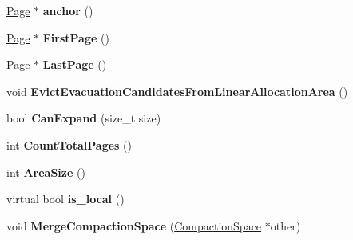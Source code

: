 \begin{DoxyCompactItemize}
\item 
\hyperlink{classv8_1_1internal_1_1_page}{Page} $\ast$ {\bfseries anchor} ()\hypertarget{classv8_1_1internal_1_1_paged_space_a66a4527d2121356cad29935ecfdcb6c9}{}\label{classv8_1_1internal_1_1_paged_space_a66a4527d2121356cad29935ecfdcb6c9}

\item 
\hyperlink{classv8_1_1internal_1_1_page}{Page} $\ast$ {\bfseries First\+Page} ()\hypertarget{classv8_1_1internal_1_1_paged_space_a4bb04dc4c0be6f0d8d98f47a3ea96ccf}{}\label{classv8_1_1internal_1_1_paged_space_a4bb04dc4c0be6f0d8d98f47a3ea96ccf}

\item 
\hyperlink{classv8_1_1internal_1_1_page}{Page} $\ast$ {\bfseries Last\+Page} ()\hypertarget{classv8_1_1internal_1_1_paged_space_a1c5d5e6fbf1a256f7e639a29344d3454}{}\label{classv8_1_1internal_1_1_paged_space_a1c5d5e6fbf1a256f7e639a29344d3454}

\item 
void {\bfseries Evict\+Evacuation\+Candidates\+From\+Linear\+Allocation\+Area} ()\hypertarget{classv8_1_1internal_1_1_paged_space_aeb689898c693798dcc4eecb13fe0e215}{}\label{classv8_1_1internal_1_1_paged_space_aeb689898c693798dcc4eecb13fe0e215}

\item 
bool {\bfseries Can\+Expand} (size\+\_\+t size)\hypertarget{classv8_1_1internal_1_1_paged_space_a39fa697858764fdc843514eb78f1eb91}{}\label{classv8_1_1internal_1_1_paged_space_a39fa697858764fdc843514eb78f1eb91}

\item 
int {\bfseries Count\+Total\+Pages} ()\hypertarget{classv8_1_1internal_1_1_paged_space_a6af30463ab9b8ba5a9262105966141f1}{}\label{classv8_1_1internal_1_1_paged_space_a6af30463ab9b8ba5a9262105966141f1}

\item 
int {\bfseries Area\+Size} ()\hypertarget{classv8_1_1internal_1_1_paged_space_a016c01ceec1db5de9d488307d4ffad9f}{}\label{classv8_1_1internal_1_1_paged_space_a016c01ceec1db5de9d488307d4ffad9f}

\item 
virtual bool {\bfseries is\+\_\+local} ()\hypertarget{classv8_1_1internal_1_1_paged_space_afb305bd5b7becd7c672294ee34cd4649}{}\label{classv8_1_1internal_1_1_paged_space_afb305bd5b7becd7c672294ee34cd4649}

\item 
void {\bfseries Merge\+Compaction\+Space} (\hyperlink{classv8_1_1internal_1_1_compaction_space}{Compaction\+Space} $\ast$other)\hypertarget{classv8_1_1internal_1_1_paged_space_a07c8e12295961020e9fda32ae29204d4}{}\label{classv8_1_1internal_1_1_paged_space_a07c8e12295961020e9fda32ae29204d4}


\end{DoxyCompactItemize}
